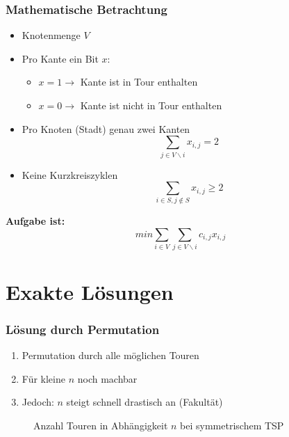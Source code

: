 \documentclass[handout]{beamer}
\begin{document}
  \begin{frame}
    \frametitle{Mathematische Betrachtung}
    \begin{itemize}
      \item Knotenmenge $V$
      \item Pro Kante ein Bit $x$:
      \begin{itemize}
        \item $x=1 \rightarrow$ Kante ist in Tour enthalten
        \item $x=0 \rightarrow$ Kante ist nicht in Tour enthalten 
      \end{itemize}
      \item
        Pro Knoten (Stadt) genau zwei Kanten
        $$\sum_{j \in V \backslash i}x_{i,j} = 2$$
      \item
        Keine Kurzkreiszyklen
        $$\sum_{i \in S, j \notin S}x_{i,j} \geq 2$$
    \end{itemize}
    \pause
    \textbf{Aufgabe ist:}
    $$min\sum_{i \in V} \sum_{j \in V \backslash i} c_{i,j}x_{i,j}$$
  \end{frame}

  \section{Exakte Lösungen}

  \begin{frame}
    \frametitle{Lösung durch Permutation}

    \begin{enumerate}[<+->]
      \item Permutation durch alle möglichen Touren
      \item Für kleine $n$ noch machbar
      \item Jedoch: $n$ steigt schnell drastisch an (Fakultät)
    \end{enumerate}

    \pause

    \begin{figure}
      \centering
      \caption{Anzahl Touren in Abhängigkeit $n$ bei symmetrischem TSP}
    \end{figure}
  \end{frame}
\end{document}
